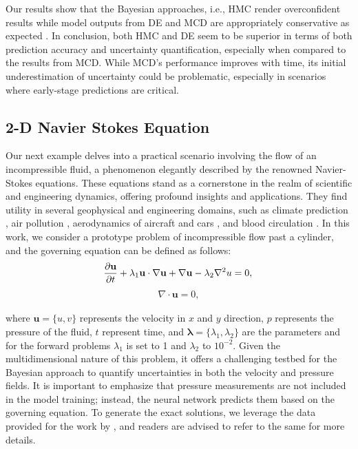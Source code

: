 \documentclass{article}
\begin{document}
Our results show that the Bayesian approaches, i.e., HMC render overconfident results while model outputs from DE and MCD are appropriately conservative as expected \citep{basu2022uncertainty}.
In conclusion, both HMC and DE seem to be superior in terms of both prediction accuracy and uncertainty quantification, especially when compared to the results from MCD. 
While MCD's performance improves with time, its initial underestimation of uncertainty could be problematic, especially in scenarios where early-stage predictions are critical.

\subsection{2-D Navier Stokes Equation}\label{sec:NS-eqn}
Our next example delves into a practical scenario involving the flow of an incompressible fluid, a phenomenon elegantly described by the renowned Navier-Stokes equations. 
These equations stand as a cornerstone in the realm of scientific and engineering dynamics, offering profound insights and applications. 
They find utility in several geophysical and engineering domains, such as climate prediction \citep{palmer2019stochastic}, air pollution \citep{adair2015reynolds}, aerodynamics of aircraft and cars \citep{hassan2014numerical, liu2016navier, vos2002navier}, and blood circulation \citep{thomas2016blood, AlbertoS}. 
In this work, we consider a prototype problem of incompressible flow past a cylinder, and the governing equation can be defined as follows:
%
\begin{equation}\label{eqn:NS}
    \frac{\partial \mathbf{u}}{\partial t} + \lambda_1 \mathbf{u} \cdot \nabla \mathbf{u} + \nabla \mathbf{u} - \lambda_2 \nabla^2 u = 0, \\
\end{equation}
\begin{gather*}
    \nabla \cdot \mathbf{u} = 0,
\end{gather*}
%

where $\mathbf{u}=\{u,v\}$ represents the velocity in $x$ and $y$ direction, $p$ represents the pressure of the fluid, $t$ represent time, and $\mathbf{\lambda}=\{\lambda_1, \lambda_2\}$ are the parameters and for the forward problems $\lambda_1$ is set to 1 and $\lambda_2$ to $10^{-2}$.
Given the multidimensional nature of this problem, it offers a challenging testbed for the Bayesian approach to quantify uncertainties in both the velocity and pressure fields.
It is important to emphasize that pressure measurements are not included in the model training; instead, the neural network predicts them based on the governing equation. To generate the exact solutions, we leverage the data provided for the work by \citep{raissi2019physics}, and readers are advised to refer to the same for more details.
\end{document}
